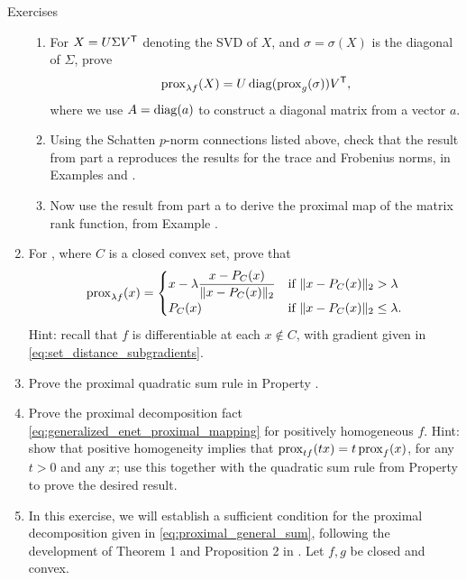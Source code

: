 \begin{xcb}{Exercises}
\begin{enumerate}[label=\thechapter.\arabic*]
\begin{enumerate}[label=\alph*.]
\item For $X = U \Sigma V^{\mathsf{T}}$ denoting the SVD of $X$, and $\sigma = \sigma(X)$
  is the diagonal of $\Sigma$, prove   
  \[
  \operatorname{prox}_{\lambda f}(X) = U \operatorname{diag}(\operatorname{prox}_g(\sigma)) V^{\mathsf{T}},
  \]
  where we use $A = \operatorname{diag}(a)$ to construct a diagonal matrix from a vector $a$.    

\item Using the Schatten $p$-norm connections listed above, check that the
  result from part a reproduces the results for the trace and Frobenius norms, in
  Examples  and 
  .  
  
\item Now use the result from part a to derive the proximal map of the matrix
  rank function, from Example . 
\end{enumerate}

\item For ,
  where $C$ is a closed convex set, prove that   
  \[
  \operatorname{prox}_{\lambda f}(x) = 
  \begin{cases}
  \displaystyle
  x - \lambda \frac{x - P_C(x)}{\|x - P_C(x)\|_2} & 
  \text{if $\|x - P_C(x)\|_2 > \lambda$} \\ 
  P_C(x) & \text{if $\|x - P_C(x)\|_2 \leq \lambda$}.
  \end{cases}
  \]
  Hint: recall that $f$ is differentiable at each $x \notin C$, with gradient
  given in \eqref{eq:set_distance_subgradients}.    

\item Prove the proximal quadratic sum rule in Property
  .  

\item \label{ex:generalized_enet_proximal_mapping}
  Prove the proximal decomposition fact 
  \eqref{eq:generalized_enet_proximal_mapping} for positively homogeneous 
  $f$. Hint: show that positive homogeneity implies that $\operatorname{prox}_{tf}(tx) = t
  \operatorname{prox}_f(x)$, for any $t > 0$ and any $x$; use this together with the quadratic
  sum rule from Property  to prove the
  desired result.  

\item \label{ex:proximal_general_sum}
  In this exercise, we will establish a sufficient condition for the
  proximal decomposition given in \eqref{eq:proximal_general_sum}, following the
  development of Theorem 1 and Proposition 2 in \cite{yu2013decomposing}. Let  
  $f,g$ be closed and convex.   


\end{enumerate}
\end{xcb}
